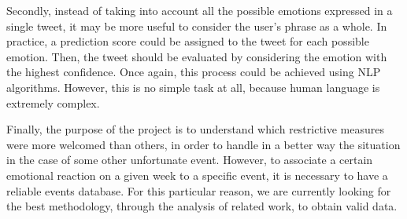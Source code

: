 Secondly, instead of taking into account all the possible emotions expressed in a single tweet, it may be more useful to consider the user's phrase as a whole. In practice, a prediction score could be assigned to the tweet for each possible emotion. Then, the tweet should be evaluated by considering the emotion with the highest confidence. Once again, this process could be achieved using NLP algorithms. However, this is no simple task at all, because human language is extremely complex.

Finally, the purpose of the project is to understand which restrictive measures were more welcomed than others, in order to handle in a better way the situation in the case of some other unfortunate event. However, to associate a certain emotional reaction on a given week to a specific event, it is necessary to have a reliable events database. For this particular reason, we are currently looking for the best methodology, through the analysis of related work, to obtain valid data. 
